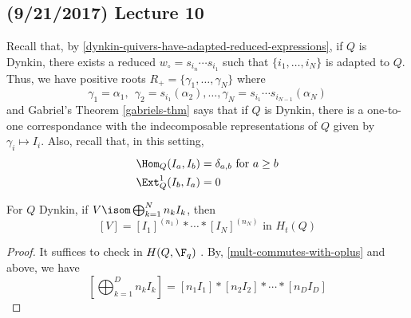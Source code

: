 \documentclass[11pt,leqno,oneside]{amsbook}
\numberwithin{thm}{section}
\renewcommand{\Q}{Q} %
\renewcommand{\roots}{R} %
\begin{document}
\subsection*{(9/21/2017) Lecture 10}
Recall that, by \ref{dynkin-quivers-have-adapted-reduced-expressions},
if \(\Q\) is Dynkin, there exists a reduced \(w_\circ = 
s_{i_n} \cdots s_{i_1}\) such that \(\{i_1, \ldots, i_N\}\) is adapted
to \(\Q\). Thus, we have positive roots \(\roots_+ = \{\gamma_1,
\ldots, \gamma_N\}\) where \[
  \gamma_1 = \alpha_1, \ \ \gamma_2 = s_{i_1}(\alpha_2), \ldots,
  \gamma_N = s_{i_1} \cdots s_{i_{N-1}}(\alpha_N) 
\] and Gabriel's Theorem \ref{gabriels-thm} says that if \(\Q\) is
Dynkin, there is a one-to-one correspondance with the indecomposable
representations of \(\Q\) given by \(\gamma_i \mapsto I_i\). Also,
recall that, in this setting, 
\begin{align*}
  \Hom_\Q(I_a, I_b) & = \delta_{a,b} \text{ for } a \geq b \\
  \Ext_\Q^1(I_b, I_a) & = 0
\end{align*}
\begin{prop}
  For \(\Q\) Dynkin, if \(V \isom \bigoplus_{k=1}^N n_k I_k\), then \[
    [V] = [I_1]^{(n_1)} * \cdots * [I_N]^{(n_N)} \text{ in } H_t(\Q)
  \]
\end{prop}
\begin{proof}
  It suffices to check in \(H(\Q,\F_q)\) . By, \ref{mult-commutes-with-oplus} and above, we have \[
    \left[ \bigoplus_{k=1}^D n_k I_k \right] = [n_1 I_1] * [n_2 I_2] *
    \cdots * [n_D I_D]
  \]
\end{proof}
\end{document}
